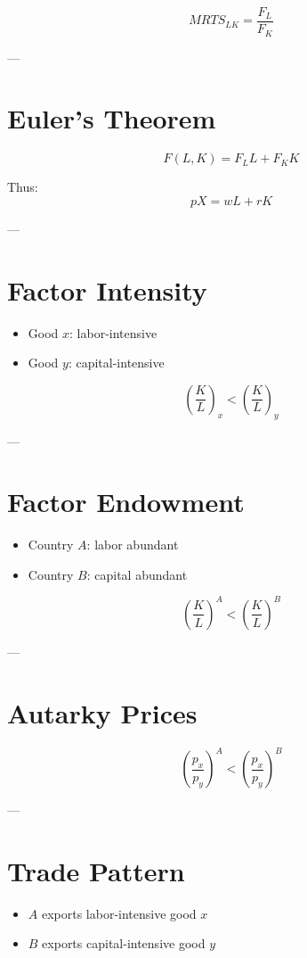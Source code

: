 \[
MRTS_{LK} = \frac{F_L}{F_K}
\]

---

\section{Euler's Theorem}

\[
F(L,K) = F_L L + F_K K
\]

Thus:
\[
pX = wL + rK
\]

---

\section{Factor Intensity}

\begin{itemize}
    \item Good $x$: labor-intensive
    \item Good $y$: capital-intensive
\end{itemize}

\[
\left(\frac{K}{L}\right)_x < \left(\frac{K}{L}\right)_y
\]

---

\section{Factor Endowment}

\begin{itemize}
    \item Country $A$: labor abundant
    \item Country $B$: capital abundant
\end{itemize}

\[
\left(\frac{K}{L}\right)^A < \left(\frac{K}{L}\right)^B
\]

---

\section{Autarky Prices}

\[
\left(\frac{p_x}{p_y}\right)^A < \left(\frac{p_x}{p_y}\right)^B
\]

---

\section{Trade Pattern}

\begin{itemize}
    \item $A$ exports labor-intensive good $x$
    \item $B$ exports capital-intensive good $y$
\end{itemize}

